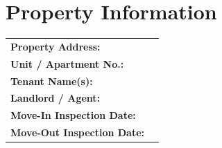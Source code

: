 
\section*{Property Information}
\label{sec:property}

\begin{tabular}{p{6cm} p{10cm}}
\textbf{Property Address:} & \PropertyAddress{}  \\ 
\textbf{Unit / Apartment No.:} & \PropertyApartment{} \\
\textbf{Tenant Name(s):} & \TenantName{} \\
\textbf{Landlord / Agent:} & \LandlordName{} \\
\textbf{Move-In Inspection Date:} & \\ 
\textbf{Move-Out Inspection Date:} & \\ 
\end{tabular}

